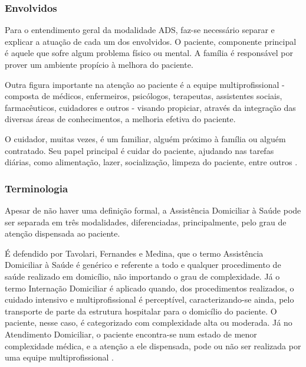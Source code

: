 \subsubsection{Envolvidos}\label{subsubsec:envolvidos}

Para o entendimento geral da modalidade ADS, faz-se necessário separar e
explicar a atuação de cada um dos envolvidos. O paciente, componente principal
é aquele que sofre algum problema físico ou mental. A família é responsável
por prover um ambiente propício à melhora do paciente.

Outra figura importante na atenção ao paciente é a equipe multiprofissional -
composta de médicos, enfermeiros, psicólogos, terapeutas, assistentes sociais,
farmacêuticos, cuidadores e outros - visando propiciar, através da integração
das diversas áreas de conhecimentos, a melhoria efetiva do paciente.

O cuidador, muitas vezes, é um familiar, alguém próximo à família ou alguém
contratado. Seu papel principal é cuidar do paciente, ajudando nas tarefas
diárias, como alimentação, lazer, socialização, limpeza do paciente, entre
outros \cite{amaral2001assistencia}.


\subsubsection{Terminologia}\label{subsubsec:terminologia}

Apesar de não haver uma definição formal, a Assistência Domiciliar à Saúde pode
ser separada em três modalidades, diferenciadas, principalmente, pelo grau de 
atenção dispensada ao paciente. 

É defendido por Tavolari, Fernandes e Medina, que o termo Assistência Domiciliar
à Saúde é genérico e referente a todo e qualquer procedimento de saúde realizado
em domicílio, não importando o grau de complexidade. Já o termo Internação
Domiciliar é aplicado quando, dos procedimentos realizados, o cuidado intensivo
e multiprofissional é perceptível, caracterizando-se ainda, pelo transporte de
parte da estrutura hospitalar para o domicílio do paciente. O paciente, nesse
caso, é categorizado com complexidade alta ou moderada.
Já no Atendimento Domiciliar, o paciente encontra-se num estado de menor 
complexidade médica, e a atenção a ele dispensada, pode ou não ser realizada por
uma equipe multiprofissional \cite{tavolari2000desenvolvimento}.

